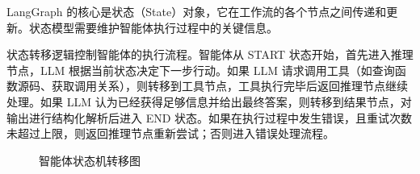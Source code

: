 LangGraph 的核心是状态（State）对象，它在工作流的各个节点之间传递和更新。状态模型需要维护智能体执行过程中的关键信息。

状态转移逻辑控制智能体的执行流程。智能体从 START 状态开始，首先进入推理节点，LLM 根据当前状态决定下一步行动。如果 LLM 请求调用工具（如查询函数源码、获取调用关系），则转移到工具节点，工具执行完毕后返回推理节点继续处理。如果 LLM 认为已经获得足够信息并给出最终答案，则转移到结果节点，对输出进行结构化解析后进入 END 状态。如果在执行过程中发生错误，且重试次数未超过上限，则返回推理节点重新尝试；否则进入错误处理流程。

\begin{figure}[htbp]
\centering
{}
\caption{智能体状态机转移图}
\label{fig:agent-state-machine}
\end{figure}
